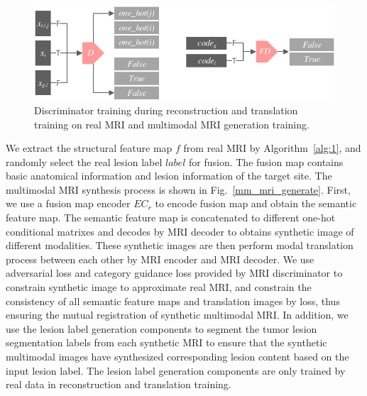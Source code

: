 \documentclass[letterpaper]{article} %
\begin{document}
\begin{figure}
	\centering
	\includegraphics[width=0.75\columnwidth]{figures/D}
	\caption{Discriminator training during reconstruction and translation training on real MRI and multimodal MRI generation training.}
	\label{train_D}
\end{figure}
We extract the structural feature map $f$ from real MRI by Algorithm~\ref{alg:1}, and randomly select the real lesion label $label$ for fusion. The fusion map contains basic anatomical information and lesion information of the target site. The multimodal MRI synthesis process is shown in Fig.~\ref{mm_mri_generate}. First, we use a fusion map encoder $EC_r$ to encode fusion map and obtain the semantic feature map. The semantic feature map is concatenated to different one-hot conditional matrixes and decodes by MRI decoder to obtains synthetic image of different modalities. These synthetic images are then perform modal translation process between each other by MRI encoder and MRI decoder. We use adversarial loss and category guidance loss provided by MRI discriminator to constrain synthetic image to approximate real MRI, and constrain the consistency of all semantic feature maps and translation images by loss, thus ensuring the mutual registration of synthetic multimodal MRI. In addition, we use the lesion label generation components to segment the tumor lesion segmentation labels from each synthetic MRI to ensure that the synthetic multimodal images have synthesized corresponding lesion content based on the input lesion label. The lesion label generation components are only trained by real data in reconstruction and translation training. 
\end{document}

